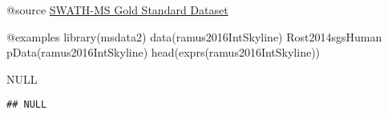 \documentclass[
]{article}
\newenvironment{Shaded}{\begin{snugshade}}{\end{snugshade}}
\newcommand{\OtherTok}[1]{\textcolor[rgb]{0.56,0.35,0.01}{#1}}
\begin{document}
@source
\href{http://compms.org/resources/reference-data/50}{SWATH-MS Gold Standard Dataset}

@examples library(msdata2) data(ramus2016IntSkyline) Rost2014sgsHuman
pData(ramus2016IntSkyline) head(exprs(ramus2016IntSkyline))

\begin{Shaded}
\begin{Highlighting}[]
\OtherTok{NULL}
\end{Highlighting}
\end{Shaded}

\begin{verbatim}
## NULL
\end{verbatim}
\end{document}
